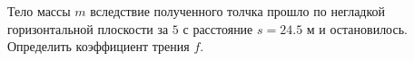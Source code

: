 Тело массы $m$ вследствие полученного толчка прошло по негладкой горизонтальной плоскости за $5$ с расстояние $s=24.5$ м 
и остановилось. Определить коэффициент трения $f$.
